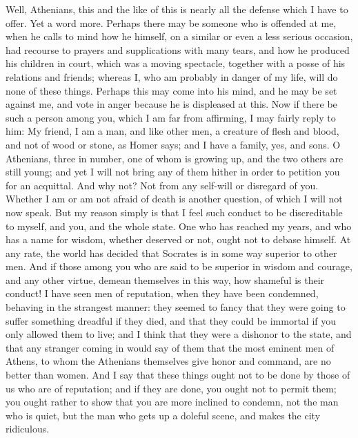 \documentclass[12pt]{article}
\begin{document}
Well, Athenians, this and the like of this is nearly all the defense
which I have to offer. Yet a word more. Perhaps there may be someone
who is offended at me, when he calls to mind how he himself, on a
similar or even a less serious occasion, had recourse to prayers and
supplications with many tears, and how he produced his children in
court, which was a moving spectacle, together with a posse of his
relations and friends; whereas I, who am probably in danger of my
life, will do none of these things. Perhaps this may come into his
mind, and he may be set against me, and vote in anger because he is
displeased at this. Now if there be such a person among you, which
I am far from affirming, I may fairly reply to him: My friend, I am
a man, and like other men, a creature of flesh and blood, and not
of wood or stone, as Homer says; and I have a family, yes, and sons.
O Athenians, three in number, one of whom is growing up, and the two
others are still young; and yet I will not bring any of them hither
in order to petition you for an acquittal. And why not? Not from any
self-will or disregard of you. Whether I am or am not afraid of death
is another question, of which I will not now speak. But my reason
simply is that I feel such conduct to be discreditable to myself,
and you, and the whole state. One who has reached my years, and who
has a name for wisdom, whether deserved or not, ought not to debase
himself. At any rate, the world has decided that Socrates is in some
way superior to other men. And if those among you who are said to
be superior in wisdom and courage, and any other virtue, demean themselves
in this way, how shameful is their conduct! I have seen men of reputation,
when they have been condemned, behaving in the strangest manner: they
seemed to fancy that they were going to suffer something dreadful
if they died, and that they could be immortal if you only allowed
them to live; and I think that they were a dishonor to the state,
and that any stranger coming in would say of them that the most eminent
men of Athens, to whom the Athenians themselves give honor and command,
are no better than women. And I say that these things ought not to
be done by those of us who are of reputation; and if they are done,
you ought not to permit them; you ought rather to show that you are
more inclined to condemn, not the man who is quiet, but the man who
gets up a doleful scene, and makes the city ridiculous.
\end{document}
